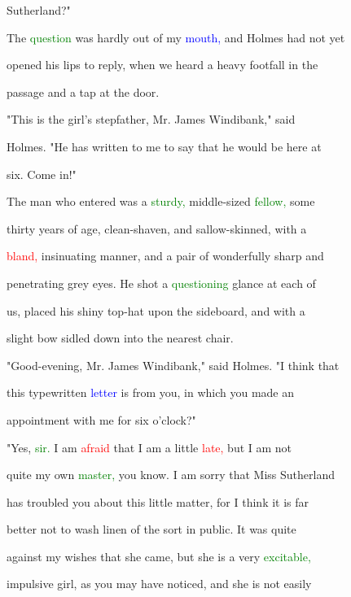  Sutherland?"



 The \textcolor{green}{question} was hardly out of my \textcolor{blue}{mouth,} and Holmes had not yet

 opened his lips to reply, when we heard a heavy footfall in the

 passage and a tap at the door.



 "This is the girl's stepfather, Mr. James Windibank," said

 Holmes. "He has written to me to say that he would be here at

 six. Come in!"



 The man who entered was a \textcolor{green}{sturdy,} middle-sized \textcolor{green}{fellow,} some

 thirty years of age, clean-shaven, and sallow-skinned, with a

 \textcolor{red}{bland,} insinuating manner, and a pair of \textcolor{BurntOrange}{wonderfully} sharp and

 penetrating grey eyes. He \textcolor{BurntOrange}{shot} a \textcolor{green}{questioning} glance at each of

 us, placed his shiny top-hat upon the sideboard, and with a

 slight bow sidled down into the nearest chair.



 "Good-evening, Mr. James Windibank," said Holmes. "I think that

 this typewritten \textcolor{blue}{letter} is from you, in which you made an

 appointment with me for six o'clock?"



 "Yes, \textcolor{green}{sir.} I am \textcolor{red}{afraid} that I am a little \textcolor{red}{late,} but I am not

 quite my own \textcolor{green}{master,} you know. I am sorry that Miss Sutherland

 has troubled you about this little matter, for I think it is far

 better not to wash linen of the sort in \textcolor{BurntOrange}{public.} It was quite

 against my wishes that she came, but she is a very \textcolor{green}{excitable,}

 impulsive girl, as you may have noticed, and she is not easily

